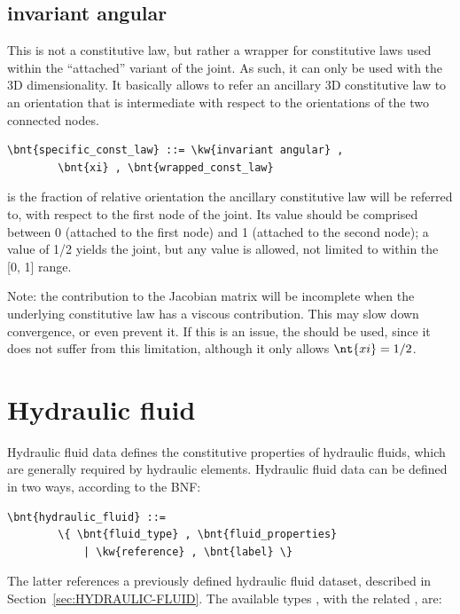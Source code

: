 \subsection{invariant angular}
This is not a constitutive law, but rather a wrapper
for constitutive laws used within the ``attached'' variant
of the  joint.
As such, it can only be used with the 3D dimensionality.
It basically allows to refer an ancillary 3D constitutive law
to an orientation that is intermediate with respect to the orientations
of the two connected nodes.
\begin{Verbatim}[commandchars=\\\{\}]
    \bnt{specific_const_law} ::= \kw{invariant angular} ,
        \bnt{xi} , \bnt{wrapped_const_law}
\end{Verbatim}
 is the fraction of relative orientation the ancillary
constitutive law will be referred to, with respect
to the first node of the joint.
Its value should be comprised between 0 (attached to the first node)
and 1 (attached to the second node); a value of 1/2 yields
the 
joint, but any value is allowed, not limited to within the [0, 1] range.

Note: the contribution to the Jacobian matrix will be incomplete
when the underlying constitutive law has a viscous contribution.
This may slow down convergence, or even prevent it.
If this is an issue,
the 
should be used, since it does not suffer from this limitation,
although it only allows $\nt{xi} = 1/2$.

\section{Hydraulic fluid}\label{sec:HydraulicFluid}
Hydraulic fluid data defines the constitutive properties
of hydraulic fluids, which are generally required by hydraulic elements.
Hydraulic fluid data can be defined in two ways, according to the BNF:
\begin{Verbatim}[commandchars=\\\{\}]
    \bnt{hydraulic_fluid} ::=
        \{ \bnt{fluid_type} , \bnt{fluid_properties}
            | \kw{reference} , \bnt{label} \}
\end{Verbatim}
The latter references a previously defined hydraulic fluid dataset,
described in Section~\ref{sec:HYDRAULIC-FLUID}.
The available types ,
with the related , are:

